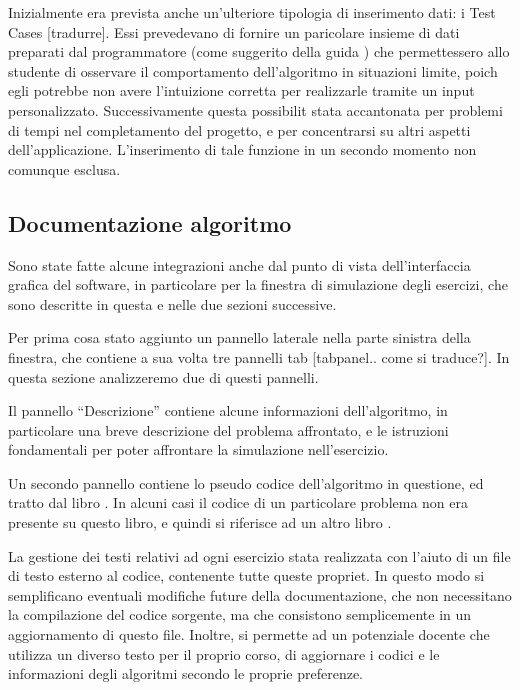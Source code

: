 Inizialmente era prevista anche un'ulteriore tipologia di inserimento
dati: i Test Cases {[}tradurre{]}. Essi prevedevano di fornire un
paricolare insieme di dati preparati dal programmatore (come suggerito
della guida \cite{wikiAlgoViz}) che permettessero allo studente di
osservare il comportamento dell'algoritmo in situazioni limite, poich
egli potrebbe non avere l'intuizione corretta per realizzarle tramite
un input personalizzato. Successivamente questa possibilit  stata
accantonata per problemi di tempi nel completamento del progetto,
e per concentrarsi su altri aspetti dell'applicazione. L'inserimento
di tale funzione in un secondo momento non  comunque esclusa.


\subsection{Documentazione algoritmo}

Sono state fatte alcune integrazioni anche dal punto di vista dell'interfaccia
grafica del software, in particolare per la finestra di simulazione
degli esercizi, che sono descritte in questa e nelle due sezioni successive.

Per prima cosa  stato aggiunto un pannello laterale nella parte sinistra
della finestra, che contiene a sua volta tre pannelli tab {[}tabpanel..
come si traduce?{]}. In questa sezione analizzeremo due di questi
pannelli.

Il pannello {}``Descrizione'' contiene alcune informazioni dell'algoritmo,
in particolare una breve descrizione del problema affrontato, e le
istruzioni fondamentali per poter affrontare la simulazione nell'esercizio. 

Un secondo pannello contiene lo pseudo codice dell'algoritmo in questione,
ed  tratto dal libro \cite{libro}. In alcuni casi il codice di un
particolare problema non era presente su questo libro, e quindi si
riferisce ad un altro libro \cite{cormen}.

La gestione dei testi relativi ad ogni esercizio  stata realizzata
con l'aiuto di un file di testo esterno al codice, contenente tutte
queste propriet. In questo modo si semplificano eventuali modifiche
future della documentazione, che non necessitano la compilazione del
codice sorgente, ma che consistono semplicemente in un aggiornamento
di questo file. Inoltre, si permette ad un potenziale docente che
utilizza un diverso testo per il proprio corso, di aggiornare i codici
e le informazioni degli algoritmi secondo le proprie preferenze.

